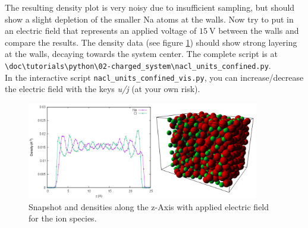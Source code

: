 \documentclass[
a4paper,                        %
11pt,                           %
twoside,                        %
footsepline,                    %
headsepline,                    %
headexclude,                    %
footexclude,                    %
pagesize,                       %
]{scrartcl}
\begin{document}
The resulting density plot is very noisy due to insufficient sampling, but should show a slight depletion of the smaller Na atoms
at the walls. Now try to put in an electric field that represents an applied voltage of $15 \ \mathrm{V}$ between the walls and compare the results.
The density data (see figure \ref{fig:nacl_confined}) should show strong layering at the walls, decaying towards the system center.
The complete script is at \\
\verb|\doc\tutorials\python\02-charged_system\nacl_units_confined.py|.\\
In the interactive script \verb|nacl_units_confined_vis.py|, you can increase/decrease the electric field with the keys \emph{u/j} (at your own risk).

\begin{figure}[tb]
  \centering
  \includegraphics[width=0.9\textwidth]{figures/nacl_units_confined}
  \caption{Snapshot and densities along the z-Axis with applied electric field for the ion species.}
  \label{fig:nacl_confined}
\end{figure}
\end{document}
